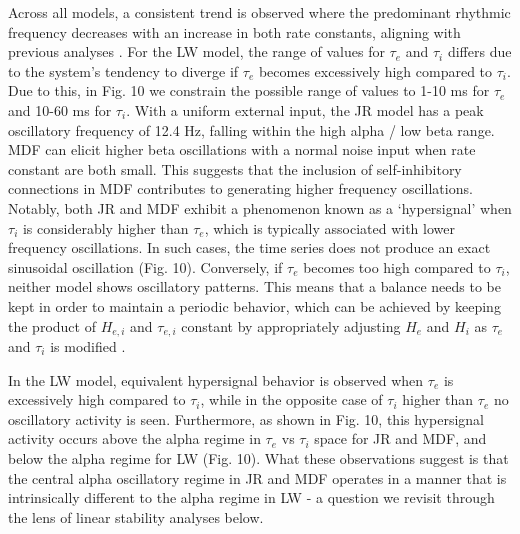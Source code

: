 \documentclass[12pt,twoside]{article}
\begin{document}
Across all models, a consistent trend is observed where the predominant rhythmic frequency decreases with an increase in both rate constants, aligning with previous analyses \citep{david2003neural}. For the LW model, the range of values for $\tau_e$ and $\tau_i$ differs due to the system's tendency to diverge if $\tau_e$ becomes excessively high compared to $\tau_i$. Due to this, in Fig. 10 we constrain the possible range of values to 1-10 ms for $\tau_e$ and 10-60 ms for $\tau_i$.
With a uniform external input, the JR model has a peak oscillatory frequency of 12.4 Hz, falling within the high alpha / low beta range. MDF can elicit higher beta oscillations with a normal noise input when rate constant are both small. This suggests that the inclusion of self-inhibitory connections in MDF contributes to generating higher frequency oscillations. Notably, both JR and MDF exhibit a phenomenon known as a `hypersignal' \citep{david2003neural} when $\tau_i$ is considerably higher than $\tau_e$, which is typically associated with lower frequency oscillations. In such cases, the time series does not produce an exact sinusoidal oscillation (Fig. 10). Conversely, if $\tau_e$ becomes too high compared to $\tau_i$, neither model shows oscillatory patterns. This means that a balance needs to be kept in order to maintain a periodic behavior, which can be achieved by keeping the product of $H_{e,i}$ and $\tau_{e,i}$ constant by appropriately adjusting $H_e$ and $H_i$ as $\tau_e$ and $\tau_i$ is modified \citep{david2003neural}. 

In the LW model, equivalent hypersignal behavior is observed when $\tau_e$ is excessively high compared to $\tau_i$, while in the opposite case of $\tau_i$ higher than $\tau_e$ no oscillatory activity is seen. Furthermore, as shown in Fig. 10, this hypersignal activity occurs above the alpha regime in $\tau_e$ vs $\tau_i$ space for JR and MDF, and below the alpha regime for LW (Fig. 10). What these observations suggest is that the central alpha oscillatory regime in JR and MDF operates in a manner that is intrinsically different to the alpha regime in LW - a question we revisit through the lens of linear stability analyses below. 
\end{document}
